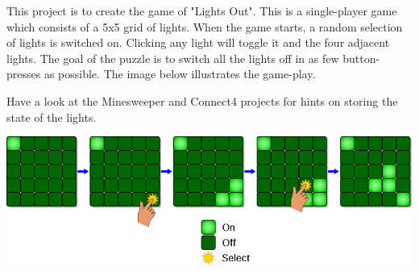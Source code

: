 This project is to create the game of "Lights Out". This is a single-player
game which consists of a 5x5 grid of lights. When the game starts, a random
selection of lights is switched on. Clicking any light will toggle it and the
four adjacent lights. The goal of the puzzle is to switch all the lights off
in as few button-presses as possible. The image below illustrates the game-play.

Have a look at the Minesweeper and Connect4 projects for hints on storing the
state of the lights.

\begin{center}
\includegraphics[scale=0.6,angle=0]{screenshots/lightsout}
\end{center}

